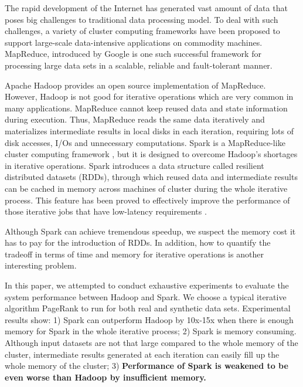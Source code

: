 \documentclass[12pt,conference,letterpaper]{IEEEtran}
\begin{document}
The rapid development of the Internet has generated vast amount of data that poses big challenges to traditional data processing model. To deal with such challenges, a variety of cluster computing frameworks have been proposed to support large-scale data-intensive applications on commodity machines. MapReduce, introduced by Google\cite{jdean2004} is one such successful framework for processing large data sets in a scalable, reliable and fault-tolerant manner. 

Apache Hadoop\cite{url_hadoop} provides an open source implementation of MapReduce.
However, Hadoop is not good for iterative operations which are very common in many applications. MapReduce cannot keep reused data and state information during execution. Thus, MapReduce reads the same data iteratively and materializes intermediate results in local disks in each iteration, requiring lots of disk accesses, I/Os and unnecessary computations. Spark is a MapReduce-like cluster computing framework \cite{url_spark, matei2010}, but it is designed to overcome Hadoop's shortages in iterative operations. Spark introduces a data structure called resilient distributed datasets (RDDs)\cite{matei2012}, through which reused data and intermediate results can be cached in memory across machines of cluster during the whole iterative process. This feature has been proved to effectively improve the performance of those iterative jobs that have low-latency requirements \cite{matei2012}.


Although Spark can achieve tremendous speedup, we suspect the memory cost it has to pay for the introduction of RDDs.  In addition, how to quantify the tradeoff in terms of time and memory for iterative operations is another interesting problem. %

In this paper, we attempted to conduct exhaustive experiments to evaluate the system performance between Hadoop and Spark. We choose a typical iterative algorithm PageRank \cite{page1999} to run for both real and synthetic data sets. Experimental results show: 1) Spark can outperform Hadoop by 10x-15x when there is enough memory for Spark in the whole iterative process; 2) Spark is memory consuming. Although input datasets are not that large compared to the whole memory of the cluster, intermediate results generated at each iteration can easily fill up the whole memory of the cluster; 3) {\bf Performance of Spark is weakened to be even worse than Hadoop by insufficient memory.}
\end{document}

